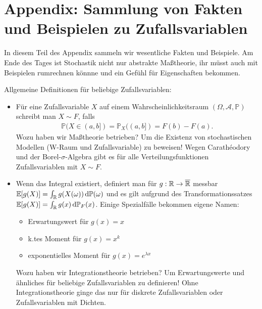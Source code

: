 \documentclass[11pt, a4paper]{book}
\newcommand{\dint}{\, \mathrm{d}}
\begin{document}
\chapter{Appendix: Sammlung von Fakten und Beispielen zu Zufallsvariablen}
In diesem Teil des Appendix sammeln wir wesentliche Fakten und Beispiele. Am Ende des Tages ist Stochastik nicht nur abstrakte Ma\ss theorie, ihr m\"usst auch mit Beispielen rumrechnen k\"onnne und ein Gef\"uhl f\"ur Eigenschaften bekommen.\smallskip

Allgemeine Definitionen f\"ur beliebige Zufallsvariablen:
\begin{itemize}
	\item F\"ur eine Zufallsvariable $X$ auf einem Wahrscheinlichkeitsraum $(\Omega, \mathcal A, \mathbb P)$ schreibt man $X\sim F$, falls 
	\begin{align*}
		\mathbb P(X\in (a,b])=\mathbb P_X((a,b])=F(b)-F(a).
	\end{align*}
	Wozu haben wir Ma\ss theorie betrieben? Um die Existenz von stochastischen Modellen (W-Raum und Zufallsvariable) zu beweisen! Wegen Carath\'eodory und der Borel-$\sigma$-Algebra gibt es f\"ur alle Verteilungsfunktionen Zufallsvariablen mit $X\sim F$.
	\item Wenn das Integral existiert, definiert man f\"ur $g:\mathbb{R}\to \overline {\mathbb{R}}$ messbar $\E[g(X)]=\int_\R g(X(\omega)) \dint \mathbb P(\omega)$ und es gilt aufgrund des Transformationssatzes $\E[g(X)]=\int_\R g(x) \dint \mathbb P_F(x)$. Einige Spezialf\"alle bekommen eigene Namen:
	\begin{itemize}
		\item Erwartungswert f\"ur $g(x)=x$
		\item k.tes Moment f\"ur $g(x)=x^k$
		\item exponentielles Moment f\"ur $g(x)=e^{\lambda x}$ 
	\end{itemize}
	 Wozu haben wir Integrationstheorie betrieben? Um Erwartungswerte und \"ahnliches f\"ur beliebige Zufallsvariablen zu definieren! Ohne Integrationstheorie ginge das nur f\"ur diskrete Zufallsvariablen oder Zufallsvariablen mit Dichten.
	 \end{itemize}
\end{document}
